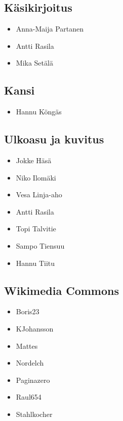 \subsection*{Käsikirjoitus}
\begin{itemize}
\item Anna-Maija Partanen
\item Antti Rasila
\item Mika Setälä
\end{itemize}

\subsection*{Kansi}
\begin{itemize}
\item Hannu Köngäs
\end{itemize}

\subsection*{Ulkoasu ja kuvitus}
\begin{itemize}
\item Jokke Häsä
\item Niko Ilomäki
\item Vesa Linja-aho
\item Antti Rasila
\item Topi Talvitie
\item Sampo Tiensuu
\item Hannu Tiitu
\end{itemize}

\subsection*{Wikimedia Commons}
\begin{itemize}
\item Boris23
\item KJohansson
\item Mattes
\item Nordelch
\item Paginazero
\item Raul654
\item Stahlkocher
\end{itemize}
